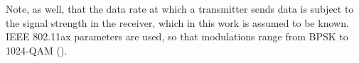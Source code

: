 \documentclass[preprint,12pt]{elsarticle}
\begin{document}
\begin{appendices}
Note, as well, that the data rate at which a transmitter sends data is subject to the signal strength in the receiver, which in this work is assumed to be known. IEEE 802.11ax parameters are used, so that modulations range from BPSK to 1024-QAM (\citealp{ieee2015qam}).
%

\end{appendices}
\end{document}
